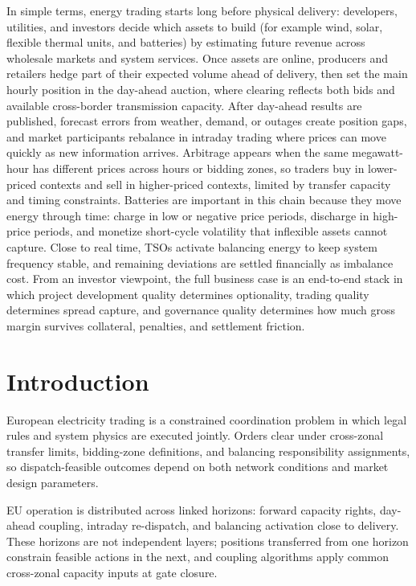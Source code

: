 \documentclass[oneside,10pt]{swissi}
\begin{document}
In simple terms, energy trading starts long before physical delivery: developers, utilities, and investors decide which assets to build (for example wind, solar, flexible thermal units, and batteries) by estimating future revenue across wholesale markets and system services. Once assets are online, producers and retailers hedge part of their expected volume ahead of delivery, then set the main hourly position in the day-ahead auction, where clearing reflects both bids and available cross-border transmission capacity. After day-ahead results are published, forecast errors from weather, demand, or outages create position gaps, and market participants rebalance in intraday trading where prices can move quickly as new information arrives. Arbitrage appears when the same megawatt-hour has different prices across hours or bidding zones, so traders buy in lower-priced contexts and sell in higher-priced contexts, limited by transfer capacity and timing constraints. Batteries are important in this chain because they move energy through time: charge in low or negative price periods, discharge in high-price periods, and monetize short-cycle volatility that inflexible assets cannot capture. Close to real time, TSOs activate balancing energy to keep system frequency stable, and remaining deviations are settled financially as imbalance cost. From an investor viewpoint, the full business case is an end-to-end stack in which project development quality determines optionality, trading quality determines spread capture, and governance quality determines how much gross margin survives collateral, penalties, and settlement friction.\cite{ec_electricity_market_design_2026,acer_market_coupling_development_2026,nord_pool_day_ahead_2026,nord_pool_intraday_2026,eu_reg_2017_2195_ebgl}

\section{Introduction}
European electricity trading is a constrained coordination problem in which legal rules and system physics are executed jointly. Orders clear under cross-zonal transfer limits, bidding-zone definitions, and balancing responsibility assignments, so dispatch-feasible outcomes depend on both network conditions and market design parameters.\cite{eu_reg_2019_943,acer_market_coupling_development_2026}

EU operation is distributed across linked horizons: forward capacity rights, day-ahead coupling, intraday re-dispatch, and balancing activation close to delivery. These horizons are not independent layers; positions transferred from one horizon constrain feasible actions in the next, and coupling algorithms apply common cross-zonal capacity inputs at gate closure.\cite{eu_reg_2016_1719,acer_market_coupling_development_2026}
\end{document}
